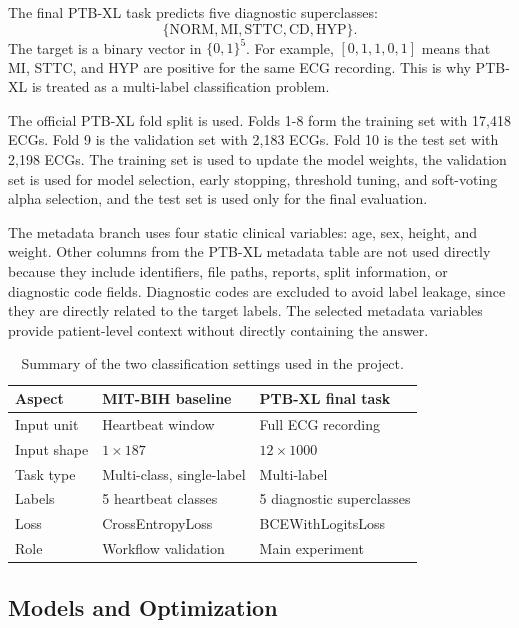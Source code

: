 \documentclass[11pt,a4paper]{article}
\begin{document}
The final PTB-XL task predicts five diagnostic superclasses:
\[
\{\text{NORM},\text{MI},\text{STTC},\text{CD},\text{HYP}\}.
\]
The target is a binary vector in \(\{0,1\}^5\). For example, \([0,1,1,0,1]\) means that MI, STTC, and HYP are positive for the same ECG recording. This is why PTB-XL is treated as a multi-label classification problem.

The official PTB-XL fold split is used. Folds 1-8 form the training set with 17,418 ECGs. Fold 9 is the validation set with 2,183 ECGs. Fold 10 is the test set with 2,198 ECGs. The training set is used to update the model weights, the validation set is used for model selection, early stopping, threshold tuning, and soft-voting alpha selection, and the test set is used only for the final evaluation.

The metadata branch uses four static clinical variables: age, sex, height, and weight. Other columns from the PTB-XL metadata table are not used directly because they include identifiers, file paths, reports, split information, or diagnostic code fields. Diagnostic codes are excluded to avoid label leakage, since they are directly related to the target labels. The selected metadata variables provide patient-level context without directly containing the answer.

\begin{table}[H]
\centering
\caption{Summary of the two classification settings used in the project.}
\begin{tabular}{lll}
\toprule
\textbf{Aspect} & \textbf{MIT-BIH baseline} & \textbf{PTB-XL final task} \\
\midrule
Input unit & Heartbeat window & Full ECG recording \\
Input shape & \(1 \times 187\) & \(12 \times 1000\) \\
Task type & Multi-class, single-label & Multi-label \\
Labels & 5 heartbeat classes & 5 diagnostic superclasses \\
Loss & CrossEntropyLoss & BCEWithLogitsLoss \\
Role & Workflow validation & Main experiment \\
\bottomrule
\end{tabular}
\end{table}

\subsection{Models and Optimization}
\end{document}
